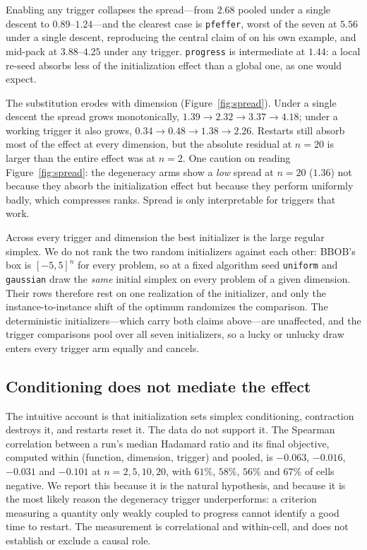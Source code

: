 \documentclass[11pt,a4paper]{article}
\begin{document}
Enabling any trigger collapses the spread---from $2.68$ pooled under a single
descent to $0.89$--$1.24$---and the clearest case is \texttt{pfeffer}, worst of
the seven at $5.56$ under a single descent, reproducing the central claim of
\citet{wessing2019} on his own example, and mid-pack at $3.88$--$4.25$ under any
trigger. \texttt{progress} is intermediate at $1.44$: a local re-seed absorbs
less of the initialization effect than a global one, as one would expect.

The substitution erodes with dimension (Figure~\ref{fig:spread}). Under a single
descent the spread grows monotonically, $1.39 \to 2.32 \to 3.37 \to 4.18$; under
a working trigger it also grows, $0.34 \to 0.48 \to 1.38 \to 2.26$. Restarts
still absorb most of the effect at every dimension, but the absolute residual at
$n=20$ is larger than the entire effect was at $n=2$. One caution on reading
Figure~\ref{fig:spread}: the degeneracy arms show a \emph{low} spread at $n=20$
($1.36$) not because they absorb the initialization effect but because they
perform uniformly badly, which compresses ranks. Spread is only interpretable
for triggers that work.

Across every trigger and dimension the best initializer is the large regular
simplex. We do not rank the two random initializers against each other: BBOB's
box is $[-5,5]^n$ for every problem, so at a fixed algorithm seed
\texttt{uniform} and \texttt{gaussian} draw the \emph{same} initial simplex on
every problem of a given dimension. Their rows therefore rest on one realization
of the initializer, and only the instance-to-instance shift of the optimum
randomizes the comparison. The deterministic initializers---which carry both
claims above---are unaffected, and the trigger comparisons pool over all seven
initializers, so a lucky or unlucky draw enters every trigger arm equally and
cancels.

\subsection{Conditioning does not mediate the effect}

The intuitive account is that initialization sets simplex conditioning,
contraction destroys it, and restarts reset it. The data do not support it. The
Spearman correlation between a run's median Hadamard ratio and its final
objective, computed within (function, dimension, trigger) and pooled, is
$-0.063$, $-0.016$, $-0.031$ and $-0.101$ at $n=2,5,10,20$, with $61\%$, $58\%$,
$56\%$ and $67\%$ of cells negative. We report this because it is the natural
hypothesis, and because it is the most likely reason the degeneracy trigger
underperforms: a criterion measuring a quantity only weakly coupled to progress
cannot identify a good time to restart. The measurement is correlational and
within-cell, and does not establish or exclude a causal role.
\end{document}
